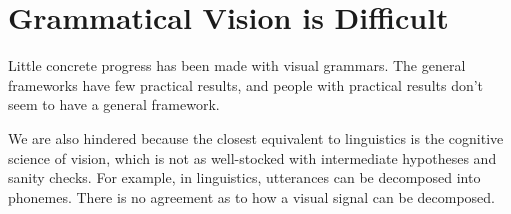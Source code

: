 \documentclass{article}
\newcommand\note[1]{}
\begin{document}









\section{Grammatical Vision is Difficult}

Little concrete progress has been made with visual grammars. The
general frameworks have few practical results, and people with
practical results don't seem to have a general framework.  \note{This
  statement feels too strong. But something like this has to be said.}

We are also hindered because the closest equivalent to linguistics is
the cognitive science of vision, which is not as well-stocked with
intermediate hypotheses and sanity checks. For example, in
linguistics, utterances can be decomposed into phonemes. There is no
agreement as to how a visual signal can be decomposed.
\end{document}
